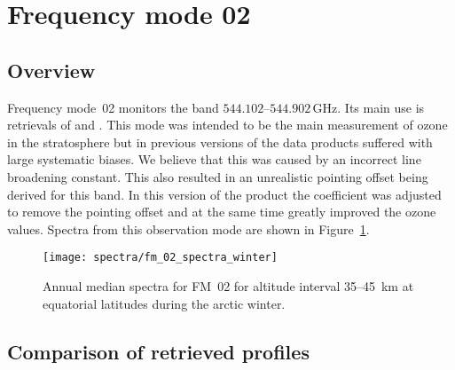 \section{Frequency mode 02}
\label{sec:fm02}

\subsection{Overview}
\label{sec:fm02:overview}
Frequency mode~02 monitors the band $544.102$--$544.902\,\mathrm{GHz}$. Its
main use is retrievals of  and . This mode was intended
to be the main measurement of ozone in the stratosphere but in previous
versions of the data products suffered with large systematic biases. We
believe that this was caused by an incorrect line broadening constant. This
also resulted in an unrealistic pointing offset being derived for this band.
In this version of the product the coefficient was adjusted to remove the
pointing offset and at the same time greatly improved the ozone values.
Spectra from this observation mode are shown in Figure~\ref{fig:spectra:02}.

\begin{figure}[ht]
    \centering
    \texttt{[image: spectra/fm\_02\_spectra\_winter]}
    \caption{Annual median spectra for FM~02 for altitude interval 35--45~km at
        equatorial latitudes during the arctic winter.
    }\label{fig:spectra:02}
\end{figure}


\subsection{Comparison of retrieved profiles}
\label{sec:fm02:comparison}



